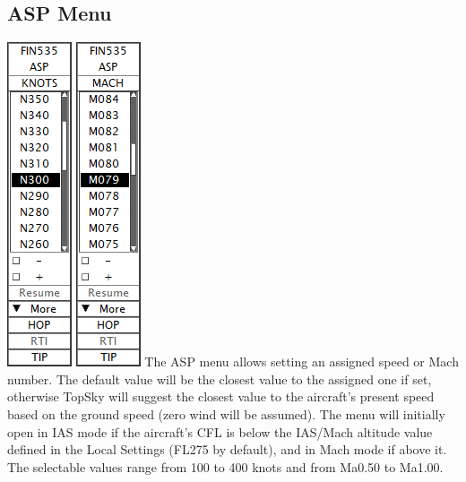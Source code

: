 \documentclass[11pt,a4paper,oldfontcommands]{memoir}
\begin{document}
\subsection{ASP Menu}
\label{menu:asp}
\includegraphics{img/asp.png}
\includegraphics{img/aspmach.png}
The ASP menu allows setting an assigned speed or Mach number. The default value will be the closest value to the assigned one if set, otherwise TopSky will suggest the closest value to the aircraft’s present speed based on the ground speed (zero wind will be assumed). The menu will initially open in IAS mode if the aircraft’s CFL is below the IAS/Mach altitude value defined in the Local Settings (FL275 by default), and in Mach mode if above it. The selectable values range from 100 to 400 knots and from Ma0.50 to Ma1.00.
\end{document}
